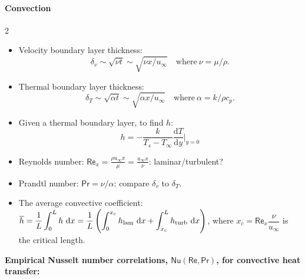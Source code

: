 \documentclass[10pt, a4paper, table]{article}
\newcommand{\Ree}{\mathsf{Re}}
\newcommand{\Prr}{\mathsf{Pr}}
\newcommand{\Nuu}{\mathsf{Nu}}
\begin{document}
\begin{mdframed} \vspace{-.5cm}
\paragraph{Convection}

\begin{multicols}{2}
\begin{itemize}    
    \item Velocity boundary layer thickness: 
    \[
        \delta_{v} \sim \sqrt{\nu t} \sim \sqrt{\nu x/u_{\infty}}
        \quad \text{where} \
        \nu=\mu/\rho.
    \]
    
    \item Thermal boundary layer thickness: 
    \[
        \delta_{T} \sim \sqrt{\alpha t} \sim \sqrt{\alpha x/u_{\infty}}
        \quad \text{where} \
        \alpha = k/\rho c_p.
    \]
    
    \item Given a thermal boundary layer, to find $h$: 
    \[
        h = - \frac{k}{T_{s}-T_{\infty}} \frac{\mathrm{d}T}{\mathrm{d}y} \bigg \vert_{y=0} 
    \]
    
    \item Reynolds number: $\displaystyle \Ree_{x} = \frac{\rho u_{\infty} x}{\mu}=\frac{u_{\infty}x}{\nu}$: laminar/turbulent?

    \item Prandtl number: $\Prr = \nu/\alpha$: compare $\delta_v$ to $\delta_T$.

\end{itemize}
\end{multicols}

\begin{itemize}
    \item The average convective coefficient: $\displaystyle \overline{h} = \frac{1}{L} \int_{0}^L h \ \mathrm{d}x = \frac{1}{L} \left( \int_{0}^{x_c} h_{\rm lam} \ \mathrm{d}x + \int_{x_c}^{L} h_{\rm turb} \ \mathrm{d}x \right)$, where $x_c = \Ree_x \dfrac{\nu}{u_\infty}$ is the critical length.
\end{itemize}

\textbf{Empirical Nusselt number correlations, $\Nuu(\Ree, \Prr)$, for convective heat transfer:}
\end{mdframed}
\end{document}
